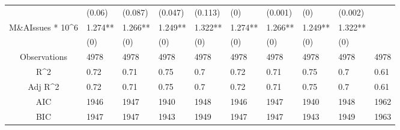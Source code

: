 \documentclass{article}
\begin{document}
\begin{table}[H]
\begin{tabular}{|clllllllll|}
   & (0.06) & (0.087) & (0.047) & (0.113) & (0) & (0.001) & (0) & (0.002) &  \\ 
  M\&AIssues * 10^6 & 1.274** & 1.266** & 1.249** & 1.322** & 1.274** & 1.266** & 1.249** & 1.322** &  \\ 
   & (0) & (0) & (0) & (0) & (0) & (0) & (0) & (0) &  \\ 
  \hline 
 Observations & 4978 & 4978 & 4978 & 4978 & 4978 & 4978 & 4978 & 4978 & 4978 \\ 
  R^2 & 0.72 & 0.71 & 0.75 & 0.7 & 0.72 & 0.71 & 0.75 & 0.7 & 0.61 \\ 
  Adj R^2 & 0.72 & 0.71 & 0.75 & 0.7 & 0.72 & 0.71 & 0.75 & 0.7 & 0.61 \\ 
  AIC & 1946 & 1947 & 1940 & 1948 & 1946 & 1947 & 1940 & 1948 & 1962 \\ 
  BIC & 1947 & 1947 & 1943 & 1949 & 1947 & 1947 & 1943 & 1949 & 1963 \\ 
   \hline
\end{tabular}
 
\end{table}
\end{document}
